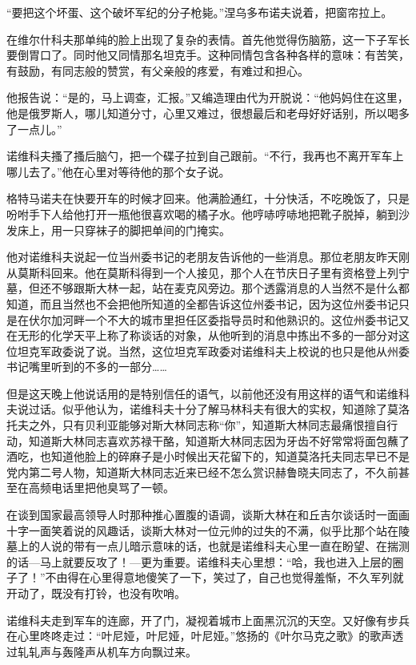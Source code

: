 “要把这个坏蛋、这个破坏军纪的分子枪毙。”涅乌多布诺夫说着，把窗帘拉上。

在维尔什科夫那单纯的脸上出现了复杂的表情。首先他觉得伤脑筋，这一下子军长要倒胃口了。同时他又同情那名坦克手。这种同情包含各种各样的意味：有苦笑，有鼓励，有同志般的赞赏，有父亲般的疼爱，有难过和担心。

他报告说：“是的，马上调查，汇报。”又编造理由代为开脱说：“他妈妈住在这里，他是俄罗斯人，哪儿知道分寸，心里又难过，很想最后和老母好好话别，所以喝多了一点儿。”

诺维科夫搔了搔后脑勺，把一个碟子拉到自己跟前。“不行，我再也不离开军车上哪儿去了。”他在心里对等待他的那个女子说。

格特马诺夫在快要开车的时候才回来。他满脸通红，十分快活，不吃晚饭了，只是吩咐手下人给他打开一瓶他很喜欢喝的橘子水。他哼哧哼哧地把靴子脱掉，躺到沙发床上，用一只穿袜子的脚把单间的门掩实。

他对诺维科夫说起一位当州委书记的老朋友告诉他的一些消息。那位老朋友昨天刚从莫斯科回来。他在莫斯科得到一个人接见，那个人在节庆日子里有资格登上列宁墓，但还不够跟斯大林一起，站在麦克风旁边。那个透露消息的人当然不是什么都知道，而且当然也不会把他所知道的全都告诉这位州委书记，因为这位州委书记只是在伏尔加河畔一个不大的城市里担任区委指导员时和他熟识的。这位州委书记又在无形的化学天平上称了称谈话的对象，从他听到的消息中拣出不多的一部分对这位坦克军政委说了说。当然，这位坦克军政委对诺维科夫上校说的也只是他从州委书记嘴里听到的不多的一部分……

但是这天晚上他说话用的是特别信任的语气，以前他还没有用这样的语气和诺维科夫说过话。似乎他认为，诺维科夫十分了解马林科夫有很大的实权，知道除了莫洛托夫之外，只有贝利亚能够对斯大林同志称“你”，知道斯大林同志最痛恨擅自行动，知道斯大林同志喜欢苏禄干酪，知道斯大林同志因为牙齿不好常常将面包蘸了酒吃，也知道他脸上的碎麻子是小时候出天花留下的，知道莫洛托夫同志早已不是党内第二号人物，知道斯大林同志近来已经不怎么赏识赫鲁晓夫同志了，不久前甚至在高频电话里把他臭骂了一顿。

在谈到国家最高领导人时那种推心置腹的语调，谈斯大林在和丘吉尔谈话时一面画十字一面笑着说的风趣话，谈斯大林对一位元帅的过失的不满，似乎比那个站在陵墓上的人说的带有一点儿暗示意味的话，也就是诺维科夫心里一直在盼望、在揣测的话—马上就要反攻了！—更为重要。诺维科夫心里想：“哈，我也进入上层的圈子了！”不由得在心里得意地傻笑了一下，笑过了，自己也觉得羞惭，不久军列就开动了，既没有打铃，也没有吹哨。

诺维科夫走到军车的连廊，开了门，凝视着城市上面黑沉沉的天空。又好像有步兵在心里咚咚走过：“叶尼娅，叶尼娅，叶尼娅。”悠扬的《叶尔马克之歌》的歌声透过轧轧声与轰隆声从机车方向飘过来。

